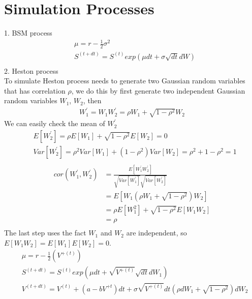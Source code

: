 \documentclass[a4paper]{article}
\begin{document}
\section{Simulation Processes}
1. BSM process\\
\begin{align*}
	& \mu = r - \frac{1}{2} \sigma^2\\
	& S^{(t + dt)} = S^{(t)}exp(\mu dt + \sigma \sqrt{dt} dW) \\
\end{align*}
2. Heston process\\
To simulate Heston process needs to generate two Gaussian random variables that has correlation $\rho$, we do this by first generate two independent Gaussian random variables $W_1$, $W_2$, then
\begin{align*}
	W_1^{'} = W_1
	W_2^{'} = \rho W_1 + \sqrt{1 - \rho^2} W_2
\end{align*}
We can easily check the mean of $W_2^{'}$
\begin{align*}
	&E[W_2^{'}] = \rho E[W_1] + \sqrt{1 - \rho^2} E[W_2] = 0\\
	&Var[W_2^{'}] = \rho^2 Var[W_1] + (1 - \rho^2) Var[W_2] = \rho^2 + 1 - \rho^2 = 1 \\
\end{align*}
\begin{align*}
	cor(W_1^{'}, W_2^{'}) & = \frac{E[W_1^{'}W_2^{'}]}{\sqrt{Var[W_1^{'}]}\sqrt{Var[W_2^{'}]}}\\
		      & = E[W_1 (\rho W_1 +\sqrt{1 - \rho^2})W_2] \\
		      & = \rho E[W_1^2] + \sqrt{1 - \rho^2} E[W_1 W_2] \\
		      & = \rho \\
\end{align*}
The last step uses the fact $W_1$ and $W_2$ are independent, so $E[W_1 W_2] = E[W_1] E[W_2] = 0$.\\
\begin{align*}
	& \mu = r - \frac{1}{2} (V^{+(t)})\\
	& S^{(t + dt)} = S^{(t)}exp(\mu dt + \sqrt{V^{+(t)}} \sqrt{dt} dW_1) \\
	& V^{(t + dt)} = V^{(t)} + (a - b V^{+{t}}) dt + \sigma \sqrt{V^{+(t)}} dt (\rho dW_1
	+ \sqrt{1 - \rho^2}) dW_2 
\end{align*}        
\end{document}
